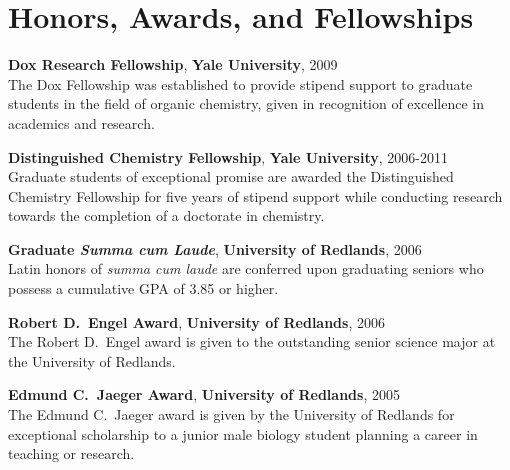 \documentclass[10pt]{article}
\newcommand*\eduitem[4]{\textbf{#1}, \textbf{#2}, #3\\#4}
\begin{document}

\section{Honors, Awards, and Fellowships}


\eduitem{Dox Research Fellowship}{Yale University}{2009}
{The Dox Fellowship was established to provide stipend support to graduate students 
in the field of organic chemistry, given in recognition of excellence in academics and research.}

\eduitem{Distinguished Chemistry Fellowship}{Yale University}{2006-2011}
{Graduate students of exceptional promise are awarded the Distinguished Chemistry Fellowship for five years of
stipend support while conducting research towards the completion of a doctorate in chemistry.}

\eduitem{Graduate \textit{Summa cum Laude}}{University of Redlands}{2006}
{Latin honors of \textit{summa cum laude} are conferred upon graduating seniors who possess a cumulative 
GPA of 3.85 or higher.}


\eduitem{Robert D.\ Engel Award}{University of Redlands}{2006}
{The Robert D.\ Engel award is given to the outstanding senior 
science major at the University of Redlands.}

\eduitem{Edmund C.\ Jaeger Award}{University of Redlands}{2005}
{The Edmund C.\ Jaeger award is given by the University of Redlands for exceptional scholarship 
to a junior male biology student planning a career in teaching or research.}

\end{document}
